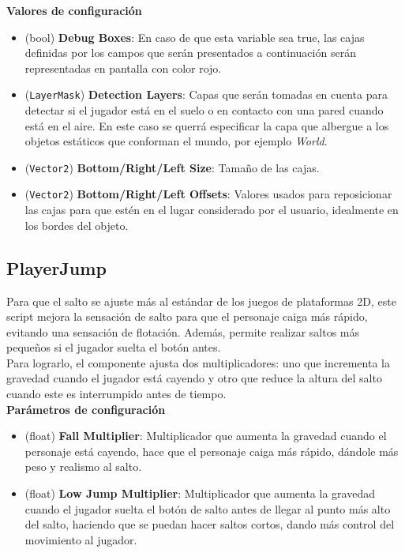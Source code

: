 \textbf{Valores de configuración}
\begin{itemize}
	\item (bool) \textbf{ Debug Boxes}: En caso de que esta variable sea true, las cajas definidas por los campos que serán presentados a continuación serán representadas en pantalla con color rojo.
	\item (\texttt{LayerMask})  \textbf{Detection Layers}: Capas que serán tomadas en cuenta para detectar si el jugador está en el suelo o en contacto con una pared cuando está en el aire. En este caso se querrá especificar la capa que albergue a los objetos estáticos que conforman el mundo, por ejemplo \textit{World}.
	\item (\texttt{Vector2}) \textbf{Bottom/Right/Left Size}: Tamaño de las cajas.
	\item (\texttt{Vector2}) \textbf{Bottom/Right/Left Offsets}: Valores usados para reposicionar las cajas para que estén en el lugar considerado por el usuario, idealmente en los bordes del objeto.
\end{itemize}

\subsection{PlayerJump}

Para que el salto se ajuste más al estándar de los juegos de plataformas 2D, este script mejora la sensación de salto para que el personaje caiga más rápido, evitando una sensación de flotación. Además, permite realizar saltos más pequeños si el jugador suelta el botón antes.\\

Para lograrlo, el componente ajusta dos multiplicadores: uno que incrementa la gravedad cuando el jugador está cayendo y otro que reduce la altura del salto cuando este es interrumpido antes de tiempo.\\

\textbf{Parámetros de configuración}
\begin{itemize}
	\item (float) \textbf{Fall Multiplier}: Multiplicador que aumenta la gravedad cuando el personaje está cayendo, hace que el personaje caiga más rápido, dándole más peso y realismo al salto.
	\item (float) \textbf{Low Jump Multiplier}: Multiplicador que aumenta la gravedad cuando el jugador suelta el botón de salto antes de llegar al punto más alto del salto, haciendo que se puedan hacer saltos cortos, dando más control del movimiento al jugador.
\end{itemize}

